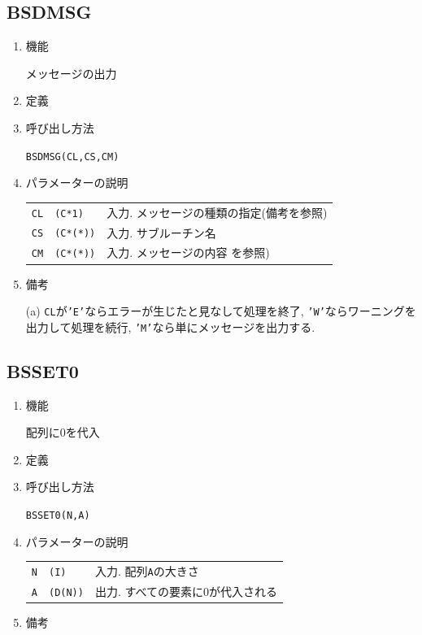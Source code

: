 \subsection{BSDMSG}

\begin{enumerate}

\item 機能 

メッセージの出力

\item 定義

\item 呼び出し方法 
    
{\tt BSDMSG(CL,CS,CM)}
  
\item パラメーターの説明 
    
\begin{tabular}{lll}
{\tt CL} & {\tt (C*1)} & 入力. メッセージの種類の指定(備考を参照)\\
{\tt CS} & {\tt (C*(*))} & 入力. サブルーチン名\\
{\tt CM} & {\tt (C*(*))} & 入力. メッセージの内容
を参照)
\end{tabular}

\item 備考

(a) {\tt CL}が{\tt 'E'}ならエラーが生じたと見なして処理を終了,
    {\tt 'W'}ならワーニングを出力して処理を続行, 
    {\tt 'M'}なら単にメッセージを出力する.

\end{enumerate}


\subsection{BSSET0}

\begin{enumerate}

\item 機能 

配列に0を代入

\item 定義

\item 呼び出し方法 
    
{\tt BSSET0(N,A)}
  
\item パラメーターの説明 
    
\begin{tabular}{lll}
{\tt N} & {\tt (I)} & 入力. 配列{\tt A}の大きさ\\
{\tt A} & {\tt (D(N))} & 出力. すべての要素に0が代入される\\
\end{tabular}

\item 備考

\end{enumerate}


